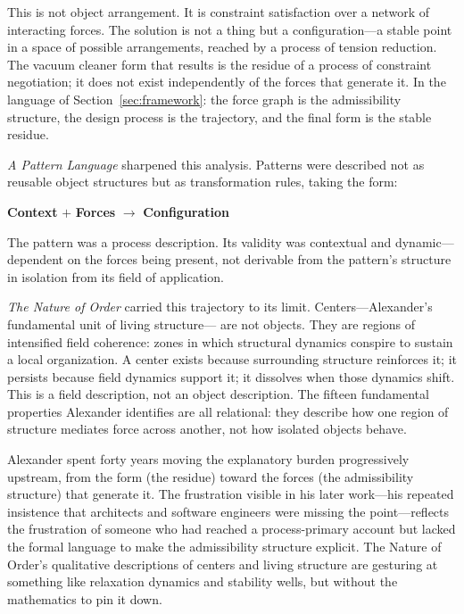 \documentclass[12pt, a4paper]{article}
\theoremstyle{plain}
\theoremstyle{definition}
\theoremstyle{remark}
\begin{document}
This is not object arrangement. It is constraint satisfaction over a network
of interacting forces. The solution is not a thing but a configuration---a
stable point in a space of possible arrangements, reached by a process of
tension reduction. The vacuum cleaner form that results is the residue of a
process of constraint negotiation; it does not exist independently of the
forces that generate it. In the language of Section~\ref{sec:framework}:
the force graph is the admissibility structure, the design process is the
trajectory, and the final form is the stable residue.

\emph{A Pattern Language} \citep{alexander1977} sharpened this analysis.
Patterns were described not as reusable object structures but as
transformation rules, taking the form:

\begin{center}
\textbf{Context} $+$ \textbf{Forces} $\longrightarrow$ \textbf{Configuration}
\end{center}

The pattern was a process description. Its validity was contextual and
dynamic---dependent on the forces being present, not derivable from the
pattern's structure in isolation from its field of application.

\emph{The Nature of Order} \citep{alexander2002} carried this trajectory
to its limit. Centers---Alexander's fundamental unit of living structure---
are not objects. They are regions of intensified field coherence: zones in
which structural dynamics conspire to sustain a local organization. A center
exists because surrounding structure reinforces it; it persists because field
dynamics support it; it dissolves when those dynamics shift. This is a field
description, not an object description. The fifteen fundamental properties
Alexander identifies are all relational: they describe how one region of
structure mediates force across another, not how isolated objects behave.

Alexander spent forty years moving the explanatory burden progressively
upstream, from the form (the residue) toward the forces (the admissibility
structure) that generate it. The frustration visible in his later work---his
repeated insistence that architects and software engineers were missing the
point---reflects the frustration of someone who had reached a process-primary
account but lacked the formal language to make the admissibility structure
explicit. The Nature of Order's qualitative descriptions of centers and
living structure are gesturing at something like relaxation dynamics and
stability wells, but without the mathematics to pin it down.
\end{document}
